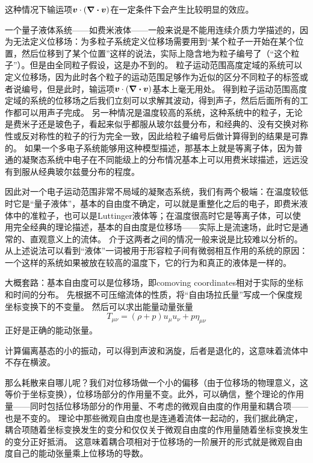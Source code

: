 这种情况下输运项$\vb*{v} \cdot (\div{\vb*{v}})$在一定条件下会产生比较明显的效应。

一个量子液体系统——如费米液体——一般来说是不能用连续介质力学描述的，因为无法定义位移场：为多粒子系统定义位移场需要用到“某个粒子一开始在某个位置，然后位移到了某个位置”这样的说法，实际上隐含地为粒子编号了（“这个粒子”）。但是由全同粒子假设，这是办不到的。
粒子运动范围高度定域的系统可以定义位移场，因为此时各个粒子的运动范围足够作为近似的区分不同粒子的标签或者说编号，但是此时，输运项$\vb*{v} \cdot (\div{\vb*{v}})$基本上毫无用处。
得到粒子运动范围高度定域的系统的位移场之后我们立刻可以求解其波动，得到声子，然后后面所有的工作都可以用声子完成。
另一种情况是温度较高的系统，这种系统中的粒子，无论是费米子还是玻色子，看起来似乎都服从玻尔兹曼分布，和经典的、没有交换对称性或反对称性的粒子的行为完全一致，因此给粒子编号后做计算得到的结果是可靠的。
如果一个多电子系统能够用这种模型描述，那基本上就是等离子体，因为普通的凝聚态系统中电子在不同能级上的分布情况基本上可以用费米球描述，远远没有到服从经典玻尔兹曼分布的程度。

因此对一个电子运动范围非常不局域的凝聚态系统，我们有两个极端：在温度较低时它是“量子液体”，基本的自由度不确定，可以就是重整化之后的电子，即费米液体中的准粒子，也可以是Luttinger液体等；在温度很高时它是等离子体，可以使用完全经典的理论描述，基本的自由度是位移场——实际上是流速场，此时它是通常的、直观意义上的流体。
介于这两者之间的情况一般来说是比较难以分析的。从上述说法可以看到“液体”一词被用于形容粒子间有微弱相互作用的系统的原因：一个这样的系统如果被放在较高的温度下，它的行为和真正的液体是一样的。

大概套路：基本自由度可以是位移场，即comoving coordinates相对于实际的坐标和时间的分布。
先根据不可压缩流体的性质，将“自由场拉氏量”写成一个保度规坐标变换下的不变量。
然后可以求出能量动量张量
\begin{equation}
    T_{\mu \nu} = (\rho + p) u_\mu u_\nu + p \eta_{\mu \nu}
\end{equation}
正好是正确的能动张量。

计算偏离基态的小的振动，可以得到声波和涡旋，后者是退化的，这意味着流体中不存在横波。

那么耗散来自哪儿呢？我们对位移场做一个小的偏移（由于位移场的物理意义，这等价于坐标变换），位移场部分的作用量不变。此外，可以确信，整个理论的作用量——同时包括位移场部分的作用量、不考虑的微观自由度的作用量和耦合项——也是不变的。
理论中那些微观自由度也是连通着流体一起动的，我们据此确定，耦合项随着坐标变换发生的变分和仅仅关于微观自由度的作用量随着坐标变换发生的变分正好抵消。
这意味着耦合项相对于位移场的一阶展开的形式就是微观自由度自己的能动张量乘上位移场的导数。

